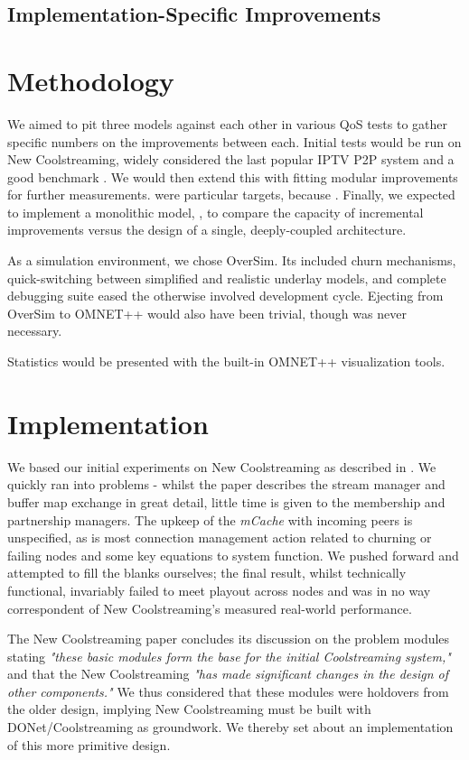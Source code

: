 \documentclass[12pt,a4paper]{article}
\begin{document}
\subsection{Implementation-Specific Improvements}
\section{Methodology}
We aimed to pit three models against each other in various QoS tests  to gather specific numbers on the improvements between each. Initial tests would be run on New Coolstreaming, widely considered the last popular IPTV P2P system and a good benchmark . We would then extend this with fitting modular improvements for further measurements.  were particular targets, because . Finally, we expected to implement a monolithic model, , to compare the capacity of incremental improvements versus the design of a single, deeply-coupled architecture.

As a simulation environment, we chose OverSim. Its included churn mechanisms, quick-switching between simplified and realistic underlay models, and complete debugging suite eased the otherwise involved development cycle. Ejecting from OverSim to OMNET++ would also have been trivial, though was never necessary.

Statistics would be presented with the built-in OMNET++ visualization tools.

\section{Implementation}
We based our initial experiments on New Coolstreaming as described in \cite{Li2008}. We quickly ran into problems - whilst the paper describes the stream manager and buffer map exchange in great detail, little time is given to the membership and partnership managers. The upkeep of the \textit{mCache} with incoming peers is unspecified, as is most connection management action related to churning or failing nodes and some key equations to system function. We pushed forward and attempted to fill the blanks ourselves; the final result, whilst technically functional, invariably failed to meet playout across nodes and was in no way correspondent of New Coolstreaming's measured real-world performance.

The New Coolstreaming paper concludes its discussion on the problem modules stating \textit{"these basic modules form the base for the initial Coolstreaming system,"} and that the New Coolstreaming \textit{"has made significant changes in the design of other components."} We thus considered that these modules were holdovers from the older design, implying New Coolstreaming must be built with  DONet/Coolstreaming as groundwork. We thereby set about an implementation of this more primitive design.
\end{document}
